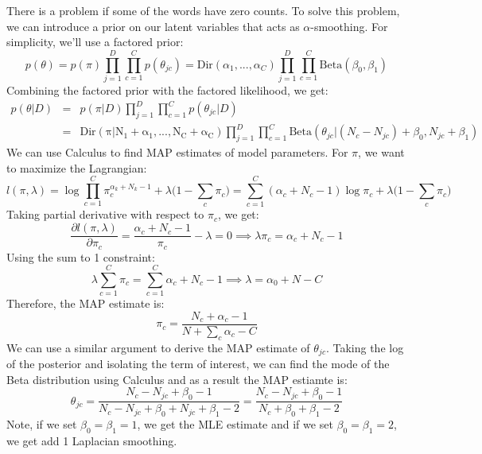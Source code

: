 There is a problem if some of the words have zero counts. To solve this problem, we can introduce a prior on our latent variables that acts as $\alpha$-smoothing. For simplicity, we'll use a factored prior:
\begin{equation}
     p(\theta) = p(\pi)\prod_{j=1}^{D}\prod_{c=1}^{C}p(\theta_{jc}) = \mathrm{Dir}(\alpha_1,...,\alpha_C)\prod_{j=1}^{D}\prod_{c=1}^{C}\mathrm{Beta}(\beta_0, \beta_1)
\end{equation}
Combining the factored prior with the factored likelihood, we get:
\begin{eqnarray}
    p(\theta|D) &=& p(\pi|D)\prod_{j=1}^{D}\prod_{c=1}^{C}p(\theta_{jc}|D) \nonumber \\
    &=& \mathrm{Dir(\pi|N_1+\alpha_1,...,N_C+\alpha_C)}\prod_{j=1}^{D}\prod_{c=1}^{C}\mathrm{Beta}(\theta_{jc}|(N_c - N_{jc}) + \beta_0, N_{jc} + \beta_1)
\end{eqnarray}
We can use Calculus to find MAP estimates of model parameters. For $\pi$, we want to maximize the Lagrangian:
\begin{equation}
    l(\pi, \lambda) = \log \prod_{c=1}^{C}\pi_{c}^{\alpha_k + N_k - 1} + \lambda \big(1-\sum_c \pi_c \big) = \sum_{c=1}^{C}(\alpha_c + N_c - 1) \log \pi_c + \lambda \big(1-\sum_c \pi_c \big)
\end{equation}
Taking partial derivative with respect to $\pi_c$, we get:
\begin{equation}
   \frac{\partial l(\pi, \lambda)}{\partial \pi_c} = \frac{\alpha_c + N_c - 1}{\pi_c} - \lambda = 0 \implies \lambda \pi_c = \alpha_c + N_c - 1
\end{equation}
Using the sum to 1 constraint:
\begin{equation}
    \lambda \sum_{c=1}^{C} \pi_c = \sum_{c=1}^{C} \alpha_c + N_c - 1 \implies \lambda = \alpha_0 +N - C
\end{equation}
Therefore, the MAP estimate is:
\begin{equation}
    \pi_c = \frac{N_c + \alpha_c - 1}{N + \sum_c \alpha_c - C}
\end{equation}
We can use a similar argument to derive the MAP estimate of $\theta_{jc}$. Taking the log of the posterior and isolating the term of interest, we can find the mode of the Beta distribution using Calculus and as a result the MAP estiamte is:
\begin{equation}
\theta_{jc} = \frac{N_c - N_{jc} + \beta_0 - 1}{N_c - N_{jc} + \beta_0 + N_{jc} + \beta_1 - 2} = \frac{N_c - N_{jc} + \beta_0 - 1}{N_c +\beta_0 + \beta_1 - 2}
\end{equation}
Note, if we set $\beta_0 = \beta_1 = 1$, we get the MLE estimate and if we set $\beta_0 = \beta_1 = 2$, we get add 1 Laplacian smoothing.\\

